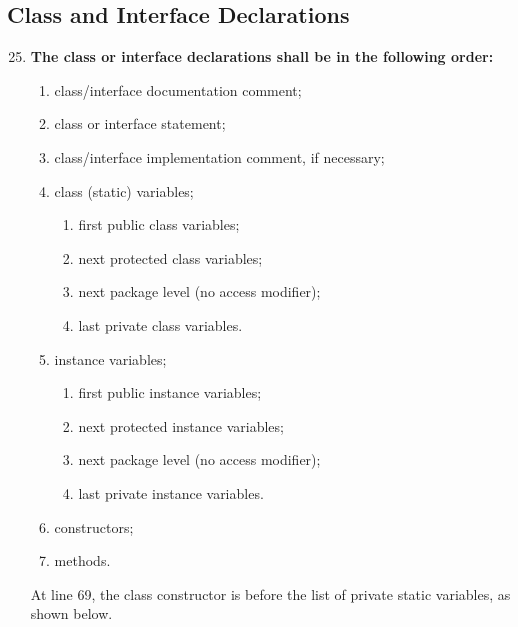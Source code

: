 \documentclass[a4paper,11pt]{report} %
\begin{document}
		
		\subsection*{Class and Interface Declarations}\begin{enumerate}[resume]
			\setcounter{enumi}{24}
			\item \textbf{The class or interface declarations shall be in the following order:}
			\begin{enumerate}
				\item class/interface documentation comment;
				\item class or interface statement;
				\item class/interface implementation comment, if necessary;
				\item class (static) variables;
				\begin{enumerate}
					\item first public class variables;
					\item next protected class variables;
					\item next package level (no access modifier);
					\item last private class variables.
				\end{enumerate}
				\item instance variables;
				\begin{enumerate}
					\item first public instance variables;
					\item next protected instance variables;
					\item next package level (no access modifier);
					\item last private instance variables.
				\end{enumerate}
				\item constructors;
				\item methods.
			\end{enumerate}\smallskip
				At line 69, the class constructor is before the list of private static variables, as shown below.

\end{enumerate}
\end{document}
